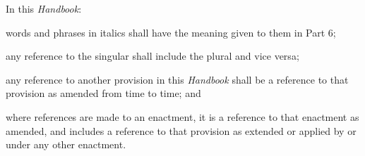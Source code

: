 
In this \emph{Handbook}:
\begin{numlist}\item words and phrases in italics shall have the meaning given to them in
Part 6;
\item any reference to the singular shall include the plural and vice
versa;
\item any reference to another provision in this \emph{Handbook} shall be a
reference to that provision as amended from time to time; and
\item where references are made to an enactment, it is a reference to that
enactment as amended, and includes a reference to that provision as
extended or applied by or under any other enactment.
\end{numlist}

